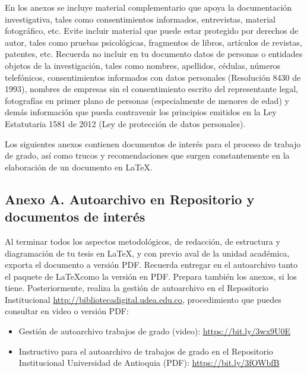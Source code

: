 \sectionCustom{\titleAppendix}


En los anexos se incluye material complementario que apoya la documentación investigativa, tales como consentimientos informados, entrevistas, material fotográfico, etc. Evite incluir material que puede estar protegido por derechos de autor, tales como pruebas psicológicas, fragmentos de libros, artículos de revistas, patentes, etc. Recuerda no incluir en tu documento datos de personas o entidades objetos de la investigación, tales como nombres, apellidos, cédulas, números telefónicos, consentimientos informados con datos personales (Resolución 8430 de 1993), nombres de empresas sin el consentimiento escrito del representante legal, fotografías en primer plano de personas (especialmente de menores de edad) y demás información que pueda contravenir los principios emitidos en la Ley Estatutaria 1581 de 2012 (Ley de protección de datos personales).

Los siguientes anexos contienen documentos de interés para el proceso de trabajo de grado, así como trucos y recomendaciones que surgen constantemente en la elaboración de un documento en \LaTeX.


\newpage


{}
\subsection*{Anexo A. Autoarchivo en Repositorio y documentos de interés}


Al terminar todos los aspectos metodológicos, de redacción, de estructura y diagramación de tu tesis en \LaTeX, y con previo aval de la unidad académica, exporta el documento a versión PDF. Recuerda entregar en el autoarchivo tanto el paquete de \LaTeX como la versión en PDF. Prepara también los anexos, si los tiene. Posteriormente, realiza la gestión de autoarchivo en el Repositorio Institucional \url{http://bibliotecadigital.udea.edu.co}, procedimiento que puedes consultar en video o versión PDF:

\begin{itemize}
    \item Gestión de autoarchivo trabajos de grado (video): \url{https://bit.ly/3wx9U0E}
    \item Instructivo para el autoarchivo de trabajos de grado en el Repositorio Institucional Universidad de Antioquia (PDF): \url{https://bit.ly/3fOWbfB}
\end{itemize}


